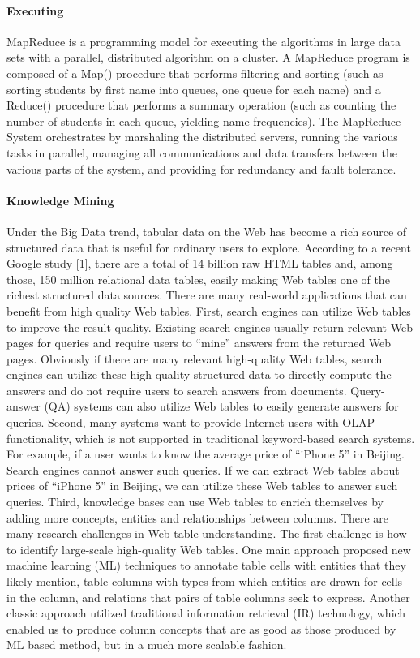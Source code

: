 \documentclass{article} %
\begin{document}
      
\paragraph{Executing}MapReduce is a programming model for executing the algorithms in large data sets with a parallel, distributed algorithm on a cluster. A MapReduce program is composed of a Map() procedure that performs filtering and sorting (such as sorting students by first name into queues, one queue for each name) and a Reduce() procedure that performs a summary operation (such as counting the number of students in each queue, yielding name frequencies). The MapReduce System orchestrates by marshaling the distributed servers, running the various tasks in parallel, managing all communications and data transfers between the various parts of the system, and providing for redundancy and fault tolerance.

\paragraph{Knowledge Mining}Under the Big Data trend, tabular data on the Web has become a rich source of structured data that is useful for ordinary users to explore.  According to a recent Google study [1], there are a total of 14 billion raw HTML tables and, among those, 150 million relational data tables, easily making Web tables one of the richest structured data sources. There are many real-world applications that can benefit from high quality Web tables. First, search engines can utilize Web tables to improve the result quality. Existing search engines usually return relevant Web pages for queries and require users to “mine” answers from the returned Web pages. Obviously if there are many relevant high-quality Web tables, search engines can utilize these high-quality structured data to directly compute the answers and do not require users to search answers from documents. Query-answer (QA) systems can also utilize Web tables to easily generate answers for queries. Second, many systems want to provide Internet users with OLAP functionality, which is not supported in traditional keyword-based search systems. For example, if a user wants to know the average price of “iPhone 5” in Beijing. Search engines cannot answer such queries. If we can extract Web tables about prices of “iPhone 5” in Beijing, we can utilize these Web tables to answer such queries. Third, knowledge bases can use Web tables to enrich themselves by adding more concepts, entities and relationships between columns.
There are many research challenges in Web table understanding. The first challenge is how to identify large-scale high-quality Web tables. One main approach proposed new machine learning (ML) techniques to annotate table cells with entities that they likely mention, table columns with types from which entities are drawn for cells in the column, and relations that pairs of table columns seek to express. Another classic approach utilized traditional information retrieval (IR) technology, which enabled us to produce column concepts that are as good as those produced by ML based method, but in a much more scalable fashion.
\end{document}
